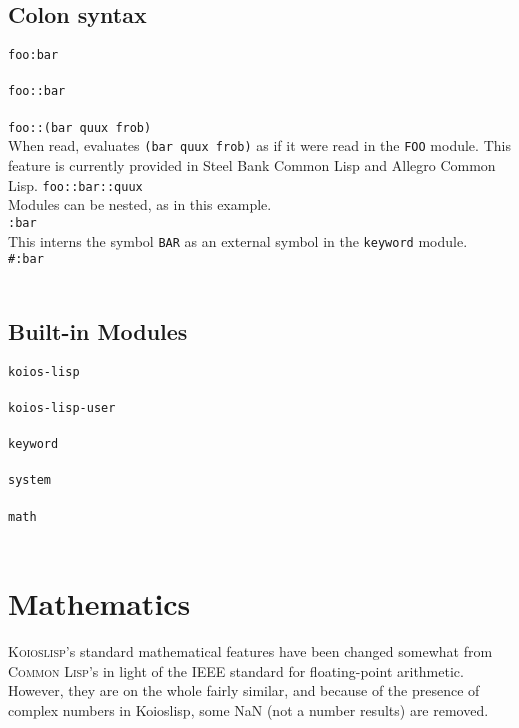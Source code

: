\documentclass[10pt]{book}
\begin{document}
\section{Colon syntax}
\texttt{foo:bar}\\
\\
\texttt{foo::bar}\\
\\
\texttt{foo::(bar quux frob)}\\
When read, evaluates \texttt{(bar quux frob)} as if it were read in the \texttt{FOO} module. This feature is currently provided in Steel Bank Common Lisp and Allegro Common Lisp. 
\texttt{foo::bar::quux}\\
Modules can be nested, as in this example.\\
\texttt{:bar}\\
This interns the symbol \texttt{BAR} as an external symbol in the \texttt{keyword} module.\\
\texttt{\#:bar}\\
\\
\section{Built-in Modules}
\texttt{koios-lisp}\\
\\
\texttt{koios-lisp-user}\\
\\
\texttt{keyword}\\
\\
\texttt{system}\\
\\
\texttt{math}\\
\\
\chapter{Mathematics}
\textsc{Koioslisp}'s standard mathematical features have been changed somewhat from \textsc{Common Lisp}'s in light of the IEEE standard for floating-point arithmetic. However, they are on the whole fairly similar, and because of the presence of complex numbers in Koioslisp, some NaN (not a number results) are removed.
\end{document}
